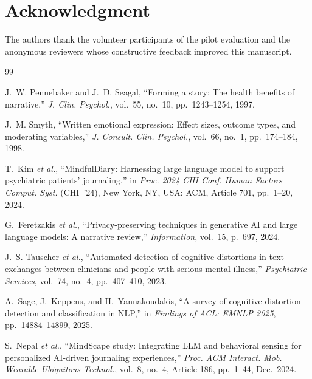 \documentclass[12pt]{article}
\begin{document}
\section*{Acknowledgment}

The authors thank the volunteer participants of the pilot evaluation and the anonymous reviewers whose constructive feedback improved this manuscript.



\begin{thebibliography}{99}

J.~W. Pennebaker and J.~D. Seagal,
``Forming a story: The health benefits of narrative,''
\textit{J. Clin. Psychol.}, vol.~55, no.~10, pp.~1243--1254, 1997.

J.~M. Smyth,
``Written emotional expression: Effect sizes, outcome types, and moderating variables,''
\textit{J. Consult. Clin. Psychol.}, vol.~66, no.~1, pp.~174--184, 1998.

T.~Kim \textit{et al.},
``MindfulDiary: Harnessing large language model to support psychiatric patients' journaling,''
in \textit{Proc. 2024 CHI Conf. Human Factors Comput. Syst.} (CHI~'24), New York, NY, USA: ACM, Article 701, pp.~1--20, 2024.

G.~Feretzakis \textit{et al.},
``Privacy-preserving techniques in generative AI and large language models: A narrative review,''
\textit{Information}, vol.~15, p.~697, 2024.

J.~S. Tauscher \textit{et al.},
``Automated detection of cognitive distortions in text exchanges between clinicians and people with serious mental illness,''
\textit{Psychiatric Services}, vol.~74, no.~4, pp.~407--410, 2023.

A.~Sage, J.~Keppens, and H.~Yannakoudakis,
``A survey of cognitive distortion detection and classification in NLP,''
in \textit{Findings of ACL: EMNLP 2025}, pp.~14884--14899, 2025.

S.~Nepal \textit{et al.},
``MindScape study: Integrating LLM and behavioral sensing for personalized AI-driven journaling experiences,''
\textit{Proc. ACM Interact. Mob. Wearable Ubiquitous Technol.}, vol.~8, no.~4, Article 186, pp.~1--44, Dec.~2024.


\end{thebibliography}
\end{document}
